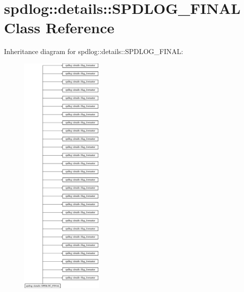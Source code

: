 \hypertarget{classspdlog_1_1details_1_1SPDLOG__FINAL}{}\section{spdlog\+:\+:details\+:\+:S\+P\+D\+L\+O\+G\+\_\+\+F\+I\+N\+AL Class Reference}
\label{classspdlog_1_1details_1_1SPDLOG__FINAL}
Inheritance diagram for spdlog\+:\+:details\+:\+:S\+P\+D\+L\+O\+G\+\_\+\+F\+I\+N\+AL\+:\begin{figure}[H]
\begin{center}
\leavevmode
\includegraphics[height=12.000000cm]{classspdlog_1_1details_1_1SPDLOG__FINAL}
\end{center}
\end{figure}
